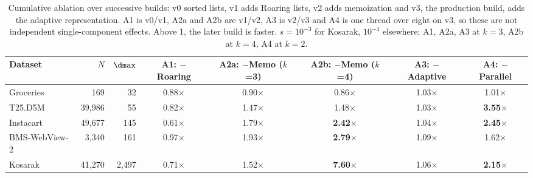 \begin{table}[t]
\caption{Cumulative ablation over successive builds: v0 sorted lists, v1 adds Roaring lists, v2 adds memoization and v3, the production build, adds the adaptive representation. A1 is v0/v1, A2a and A2b are v1/v2, A3 is v2/v3 and A4 is one thread over eight on v3, so these are not independent single-component effects. Above 1, the later build is faster. $s=10^{-3}$ for Kosarak, $10^{-4}$ elsewhere; A1, A2a, A3 at $k=3$, A2b at $k=4$, A4 at $k=2$.}\label{tab:ablation}
\small\setlength{\tabcolsep}{6pt}
\begin{tabular*}{\textwidth}{@{\extracolsep{\fill}}lrrccccc@{}}
\toprule
Dataset & $N$ & $\dmax$ & A1: $-$Roaring & A2a: $-$Memo ($k$=3) & A2b: $-$Memo ($k$=4) & A3: $-$Adaptive & A4: $-$Parallel\\
\midrule
Groceries     & 169 & 32 & 0.88$\times$ & 0.90$\times$ & 0.86$\times$ & 1.03$\times$ & 1.01$\times$\\
T25.D5M       & 39{,}986 & 55 & 0.82$\times$ & 1.47$\times$ & 1.48$\times$ & 1.03$\times$ & \textbf{3.55$\times$}\\
Instacart     & 49{,}677 & 145 & 0.61$\times$ & 1.79$\times$ & \textbf{2.42$\times$} & 1.04$\times$ & \textbf{2.45$\times$}\\
BMS-WebView-2 & 3{,}340 & 161 & 0.97$\times$ & 1.93$\times$ & \textbf{2.79$\times$} & 1.09$\times$ & 1.62$\times$\\
Kosarak       & 41{,}270 & 2{,}497 & 0.71$\times$ & 1.52$\times$ & \textbf{7.60$\times$} & 1.06$\times$ & \textbf{2.15$\times$}\\
\bottomrule
\end{tabular*}
\end{table}
